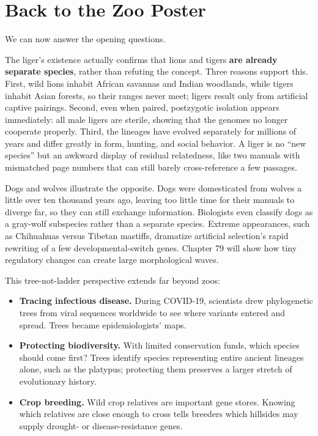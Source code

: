 \section{Back to the Zoo Poster}

We can now answer the opening questions.

The liger's existence actually confirms that lions and tigers \textbf{are already separate species}, rather than refuting the concept. Three reasons support this. First, wild lions inhabit African savannas and Indian woodlands, while tigers inhabit Asian forests, so their ranges never meet; ligers result only from artificial captive pairings. Second, even when paired, postzygotic isolation appears immediately: all male ligers are sterile, showing that the genomes no longer cooperate properly. Third, the lineages have evolved separately for millions of years and differ greatly in form, hunting, and social behavior. A liger is no ``new species'' but an awkward display of residual relatedness, like two manuals with mismatched page numbers that can still barely cross-reference a few passages.

Dogs and wolves illustrate the opposite. Dogs were domesticated from wolves a little over ten thousand years ago, leaving too little time for their manuals to diverge far, so they can still exchange information. Biologists even classify dogs as a gray-wolf subspecies rather than a separate species. Extreme appearances, such as Chihuahuas versus Tibetan mastiffs, dramatize artificial selection's rapid rewriting of a few developmental-switch genes. Chapter 79 will show how tiny regulatory changes can create large morphological waves.

This tree-not-ladder perspective extends far beyond zoos:

\begin{itemize}[itemsep=2pt]
\item \textbf{Tracing infectious disease.} During COVID-19, scientists drew phylogenetic trees from viral sequences worldwide to see where variants entered and spread. Trees became epidemiologists' maps.
\item \textbf{Protecting biodiversity.} With limited conservation funds, which species should come first? Trees identify species representing entire ancient lineages alone, such as the platypus; protecting them preserves a larger stretch of evolutionary history.
\item \textbf{Crop breeding.} Wild crop relatives are important gene stores. Knowing which relatives are close enough to cross tells breeders which hillsides may supply drought- or disease-resistance genes.
\end{itemize}


